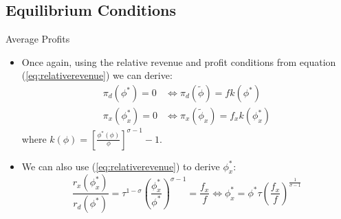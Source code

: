 \documentclass[aspectratio=169]{beamer}
\begin{document}

\subsection{Equilibrium Conditions}


\begin{frame}{Average Profits}

\begin{itemize}
    \item<1-> Once again, using the relative revenue and profit conditions from equation (\ref{eq:relativerevenue}) we can derive:
    \begin{equation*}
        \begin{split}
            \pi_{d}\left( \phi^{*} \right) = 0 &\Leftrightarrow \pi_{d}\left( \tilde{\phi} \right) = f k\left( \phi^{*} \right) \\
            \pi_{x}\left( \phi_{x}^{*} \right) = 0 &\Leftrightarrow \pi_{x}\left( \tilde{\phi}_{x} \right) = f_{x} k\left( \phi_{x}^{*} \right)
        \end{split}
    \end{equation*}
    where $ k\left( \phi \right) = \left[ \frac{\phi^{*}\left( \phi \right)}{\phi} \right]^{\sigma - 1} - 1 $.
    \item<2-> We can also use (\ref{eq:relativerevenue}) to derive $ \phi_{x}^{*} $:
    \begin{equation*}
        \frac{r_{x}\left( \phi_{x}^{*} \right)}{r_{d}\left( \phi^{*} \right)} = \tau^{1 - \sigma} \left( \frac{\phi_{x}^{*}}{\phi^{*}} \right)^{\sigma - 1} = \frac{f_{x}}{f} \Leftrightarrow \phi_{x}^{*} = \phi^{*} \tau\left( \frac{f_{x}}{f} \right)^{\frac{1}{\sigma - 1}}
    \end{equation*}
\end{itemize}
    
\end{frame}

\end{document}
